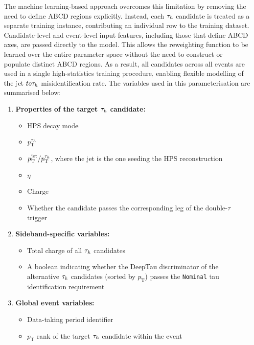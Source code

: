 The machine learning-based approach overcomes this limitation by removing the need to define ABCD regions explicitly. Instead, each $\tau_h$ candidate is treated as a separate training instance, contributing an individual row to the training dataset. Candidate-level and event-level input features, including those that define ABCD axes, are passed directly to the model. This allows the reweighting function to be learned over the entire parameter space without the need to construct or populate distinct ABCD regions. As a result, all candidates across all events are used in a single high-statistics training procedure, enabling flexible modelling of the jet $to \tau_h$ misidentification rate. The variables used in this parameterisation are summarised below:

\begin{enumerate}[label=(\roman*)]

    \item \textbf{Properties of the target $\tau_h$ candidate:}
    \begin{itemize}
        \item HPS decay mode
        \item $p_\text{T}^{\tau_h}$
        \item $p_\text{T}^\text{jet} / p_\text{T}^{\tau_h}$, where the jet is the one seeding the HPS reconstruction
        \item $\eta$
        \item Charge
        \item Whether the candidate passes the corresponding leg of the double-$\tau$ trigger
    \end{itemize}

    \item \textbf{Sideband-specific variables:}
    \begin{itemize}
        \item Total charge of all $\tau_h$ candidates
        \item A boolean indicating whether the DeepTau discriminator of the alternative $\tau_h$ candidates (sorted by $p_\text{T}$) passes the \texttt{Nominal} tau identification requirement
    \end{itemize}

    \item \textbf{Global event variables:}
    \begin{itemize}
        \item Data-taking period identifier
        \item $p_\text{T}$ rank of the target $\tau_h$ candidate within the event
    \end{itemize}

\end{enumerate}


